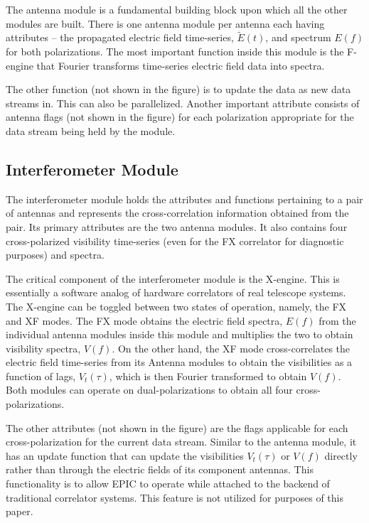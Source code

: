 \documentclass[a4paper,fleqn,usenatbib]{mnras}
\begin{document}
The antenna module is a fundamental building block upon which all the other modules are built. There is one antenna module per antenna each having attributes -- the propagated electric field time-series, $\widetilde{E}(t)$, and spectrum $E(f)$ for both polarizations. The most important function inside this module is the F-engine that Fourier transforms time-series electric field data into spectra. 

The other function (not shown in the figure) is to update the data as new data 
streams in. This can also be parallelized. Another important attribute consists 
of antenna flags (not shown in the figure) for each polarization appropriate 
for the data stream being held by the module. 

\subsection{Interferometer Module}

The interferometer module holds the attributes and functions pertaining to a pair of antennas and represents the cross-correlation information obtained from the pair. Its primary attributes are the two antenna modules. It also contains four cross-polarized visibility time-series (even for the FX correlator for diagnostic purposes) and spectra. 

The critical component of the interferometer module is the X-engine. This is essentially a software analog of hardware correlators of real telescope systems. The X-engine can be toggled between two states of operation, namely, the FX and XF modes. The FX mode obtains the electric field spectra, $E(f)$ from the individual antenna modules inside this module and multiplies the two to obtain visibility spectra, $V(f)$. On the other hand, the XF mode cross-correlates the electric field time-series from its Antenna modules to obtain the visibilities as a function of lags, $V_t(\tau)$, which is then Fourier transformed to obtain $V(f)$. Both modules can operate on dual-polarizations to obtain all four cross-polarizations.

The other attributes (not shown in the figure) are the flags applicable for each
cross-polarization for the current data stream. Similar to the antenna module,
it has an update function that can update the visibilities $V_t(\tau)$ 
or $V(f)$ directly rather than through the electric fields of its 
component antennas. This functionality is to allow EPIC to operate while 
attached to the backend of traditional correlator systems. This feature is not 
utilized for purposes of this paper.
\end{document}
